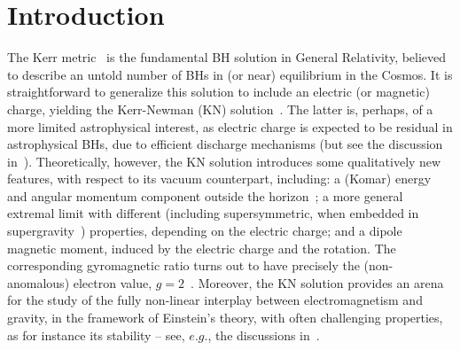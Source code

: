 \documentclass{article}
\begin{document}



\section{Introduction}
The Kerr metric~\cite{Kerr:1963ud} is the fundamental BH solution in General Relativity, believed to describe an untold number of BHs in (or near) equilibrium in the Cosmos. It is straightforward to generalize this solution to include an electric (or magnetic) charge, yielding the Kerr-Newman (KN) solution~\cite{Newman:1965my}. The latter is, perhaps, of a more limited astrophysical interest, as electric charge is expected to be residual in astrophysical BHs, due to efficient discharge mechanisms (but see the discussion in~\cite{Cardoso:2016olt}). Theoretically, however, the KN solution introduces some qualitatively new features, with respect to its vacuum counterpart, including: a (Komar) energy and angular momentum component outside the horizon~\cite{Delgado:2016zxv}; a more general extremal limit with different (including supersymmetric, when embedded in supergravity~\cite{Gibbons:1982fy,Tod:1983pm,Herdeiro:2000ap}) properties, depending on the electric charge; and a dipole magnetic moment, induced by the electric charge and the rotation. The corresponding gyromagnetic ratio turns out to have precisely the (non-anomalous) electron value, $g=2$~\cite{Carter:1968rr}. Moreover, the KN solution provides an arena for the study of the fully non-linear interplay between electromagnetism and gravity, in the framework of Einstein's theory, with often challenging properties, as for instance its stability -- see, $e.g.$, the discussions in~\cite{Pani:2013ija,Pani:2013wsa,Zilhao:2014wqa}.

\bigskip
\end{document}
